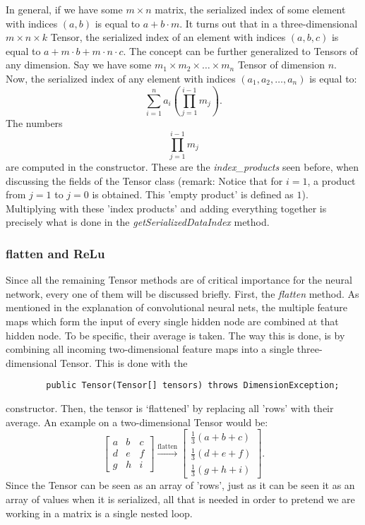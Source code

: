 \documentclass[12pt, titlepage]{article}
\begin{document}
		In general, if we have some $m\times n$ matrix, the serialized index of some element with indices $(a,b)$ is equal to $a+b\cdot m$. It turns out that in a three-dimensional $m\times n\times k$ Tensor, the serialized index of an element with indices $(a,b,c)$ is equal to $a+m\cdot b+m\cdot n\cdot c$. The concept can be further generalized to Tensors of any dimension. Say we have some $m_1\times m_2\times\ldots\times m_n$ Tensor of dimension $n$. Now, the serialized index of any element with indices $(a_1,a_2,\ldots,a_n)$ is equal to:
		\begin{equation*}
		\sum_{i=1}^{n}a_i\left(\prod_{j=1}^{i-1}m_j\right).
		\end{equation*}
		The numbers
		\begin{equation*}
		\prod_{j=1}^{i-1}m_j
		\end{equation*}
		are computed in the constructor. These are the \textit{index\_products} seen before, when discussing the fields of the Tensor class (remark: Notice that for $i=1$,  a product from $j=1$ to $j=0$ is obtained. This 'empty product' is defined as $1$). Multiplying with these 'index products' and adding everything together is precisely what is done in the \textit{getSerializedDataIndex} method.
		
		\subsubsection{flatten and ReLu}
		Since all the remaining Tensor methods are of critical importance for the neural network, every one of them will be discussed briefly. First, the \textit{flatten} method. As mentioned in the explanation of convolutional neural nets, the multiple feature maps which form the input of every single hidden node are combined at that hidden node. To be specific, their average is taken. The way this is done, is by combining all incoming two-dimensional feature maps into a single three-dimensional Tensor. This is done with the
		\begin{lstlisting}
		public Tensor(Tensor[] tensors) throws DimensionException;
		\end{lstlisting}
		constructor. Then, the tensor is ‘flattened’ by replacing all 'rows' with their average. An example on a two-dimensional Tensor would be:
		\begin{equation*}
		\begin{bmatrix}
		a &b &c\\
		d &e &f\\
		g &h &i
		\end{bmatrix}\stackrel{\text{flatten}}{\longrightarrow}
		\begin{bmatrix}
		\frac13(a+b+c)\\
		\frac13(d+e+f)\\
		\frac13(g+h+i)
		\end{bmatrix}.
		\end{equation*}
		Since the Tensor can be seen as an array of 'rows', just as it can be seen it as an array of values when it is serialized, all that is needed in order to pretend we are working in a matrix is a single nested loop.
		
\end{document}
